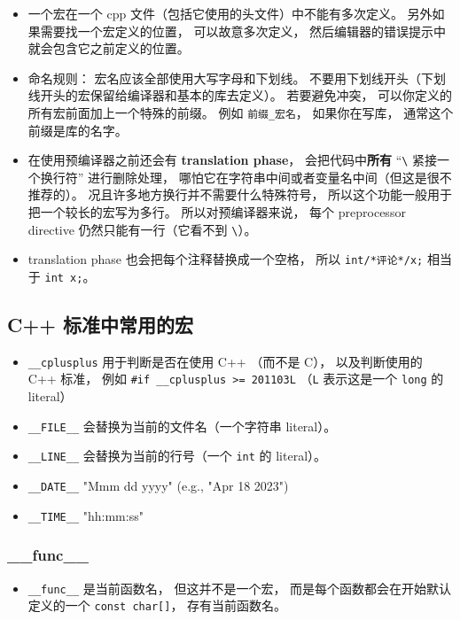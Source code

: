 \begin{itemize}
\item 一个宏在一个 cpp 文件（包括它使用的头文件）中不能有多次定义。 另外如果需要找一个宏定义的位置， 可以故意多次定义， 然后编辑器的错误提示中就会包含它之前定义的位置。
\item 命名规则： 宏名应该全部使用大写字母和下划线。 不要用下划线开头（下划线开头的宏保留给编译器和基本的库去定义）。 若要避免冲突， 可以你定义的所有宏前面加上一个特殊的前缀。 例如 \verb|前缀_宏名|， 如果你在写库， 通常这个前缀是库的名字。
\item 在使用预编译器之前还会有 \textbf{translation phase}， 会把代码中\textbf{所有} “\verb|\| 紧接一个换行符” 进行删除处理， 哪怕它在字符串中间或者变量名中间（但这是很不推荐的）。 况且许多地方换行并不需要什么特殊符号， 所以这个功能一般用于把一个较长的宏写为多行。 所以对预编译器来说， 每个 preprocessor directive 仍然只能有一行（它看不到 \verb|\|）。
\item translation phase 也会把每个注释替换成一个空格， 所以 \verb|int/*评论*/x;| 相当于 \verb|int x;|。
\end{itemize}

\subsection{C++ 标准中常用的宏}
\begin{itemize}
\item \verb|__cplusplus| 用于判断是否在使用 C++ （而不是 C）， 以及判断使用的 C++ 标准， 例如 \verb|#if __cplusplus >= 201103L| （\verb|L| 表示这是一个 \verb|long| 的 literal）
\item \verb|__FILE__| 会替换为当前的文件名（一个字符串 literal）。
\item \verb|__LINE__| 会替换为当前的行号（一个 \verb|int| 的 literal）。
\item \verb|__DATE__| "Mmm dd yyyy" (e.g., "Apr 18 2023")
\item \verb|__TIME__| "hh:mm:ss"
\end{itemize}

\subsubsection{\_\_func\_\_}
\begin{itemize}
\item \verb|__func__| 是当前函数名， 但这并不是一个宏， 而是每个函数都会在开始默认定义的一个 \verb|const char[]|， 存有当前函数名。
\end{itemize}

